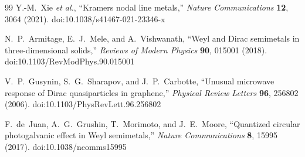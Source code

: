 \documentclass[11pt]{article}
\begin{document}
\begin{thebibliography}{99}
        Y.-M.~Xie \emph{et al.},
        ``Kramers nodal line metals,''
        \emph{Nature Communications} \textbf{12}, 3064 (2021).
        doi:10.1038/s41467-021-23346-x

        N.~P.~Armitage, E.~J.~Mele, and A.~Vishwanath,
        ``Weyl and Dirac semimetals in three-dimensional solids,''
        \emph{Reviews of Modern Physics} \textbf{90}, 015001 (2018).
        doi:10.1103/RevModPhys.90.015001

        V.~P.~Gusynin, S.~G.~Sharapov, and J.~P.~Carbotte,
        ``Unusual microwave response of Dirac quasiparticles in graphene,''
        \emph{Physical Review Letters} \textbf{96}, 256802 (2006).
        doi:10.1103/PhysRevLett.96.256802

        F.~de~Juan, A.~G.~Grushin, T.~Morimoto, and J.~E.~Moore,
        ``Quantized circular photogalvanic effect in Weyl semimetals,''
        \emph{Nature Communications} \textbf{8}, 15995 (2017).
        doi:10.1038/ncomms15995

    \end{thebibliography}
\end{document}

